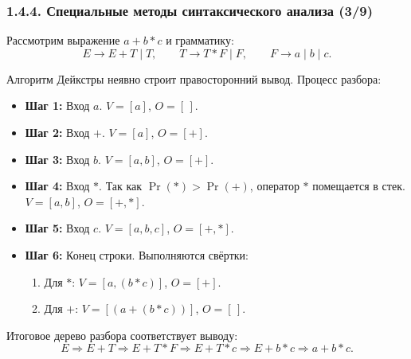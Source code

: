\begin{frame}
\frametitle{1.4.4. Специальные методы синтаксического анализа (3/9)}

\begin{example}
Рассмотрим выражение $a + b * c$ и грамматику:
\[
E \to E + T \mid T, \qquad
T \to T * F \mid F, \qquad
F \to a \mid b \mid c.
\]

Алгоритм Дейкстры неявно строит правосторонний вывод.
Процесс разбора: 
\end{example}

\begin{itemize}
\item \textbf{Шаг 1:} Вход $a$. $V = [a]$, $O = [\,]$.
\item \textbf{Шаг 2:} Вход $+$. $V = [a]$, $O = [+]$.
\item \textbf{Шаг 3:} Вход $b$. $V = [a, b]$, $O = [+]$.
\item \textbf{Шаг 4:} Вход $*$. Так как $\Pr(*) > \Pr(+)$,
оператор $*$ помещается в стек.  
$V = [a, b]$, $O = [+, *]$.
\item \textbf{Шаг 5:} Вход $c$. $V = [a, b, c]$, $O = [+, *]$.
\item \textbf{Шаг 6:} Конец строки. Выполняются свёртки:
\begin{enumerate}
\item Для $*$: $V = [a, (b * c)]$, $O = [+]$.
\item Для $+$: $V = [(a + (b * c))]$, $O = [\,]$.
\end{enumerate}
\end{itemize}

Итоговое дерево разбора соответствует выводу: 
\[
E \Rightarrow E + T
\Rightarrow E + T * F
\Rightarrow E + T * c
\Rightarrow E + b * c
\Rightarrow a + b * c.
\]

\end{frame}

